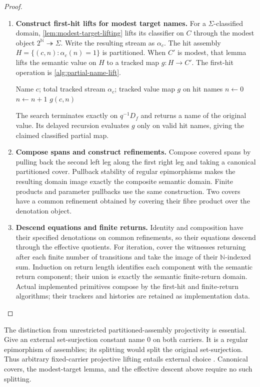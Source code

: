 \documentclass[11pt,a4paper]{article}
\numberwithin{algorithm}{section}
\numberwithin{equation}{section}
\theoremstyle{definition}
\theoremstyle{remark}
\theoremstyle{plain}
\newcommand{\N}{\mathbb N}
\newcommand{\onto}{\twoheadrightarrow}
\theoremstyle{definition}
\theoremstyle{plain}
\begin{document}
\begin{proof}
\begin{enumerate}[leftmargin=*,align=left]
\item \textbf{Construct first-hit lifts for modest target names.}
For a $\Sigma$-classified domain, \cref{lem:modest-target-lifting}
lifts its classifier on $C$ through the modest object
$2^\N\onto\Sigma$. Write the resulting stream as $\alpha_c$.
The hit assembly $H=\{(c,n):\alpha_c(n)=1\}$ is partitioned.
When $C'$ is modest, that lemma lifts the semantic value on $H$
to a tracked map $g:H\to C'$. The first-hit operation is
\cref{alg:partial-name-lift}.
\begin{algorithm}[H]
\caption{Tracked partial evaluation on a name}\label{alg:partial-name-lift}
\small
\begin{algorithmic}[1]
\Require Name $c$; total tracked stream $\alpha_c$; tracked value map $g$ on hit names
\State $n\gets0$
  \State $n\gets n+1$
\EndWhile
\State \Return $g(c,n)$
\end{algorithmic}
\end{algorithm}
The search terminates exactly on $q^{-1}D_f$ and returns a name
of the original value. Its delayed recursion evaluates $g$ only
on valid hit names, giving the claimed classified partial map.

\item \textbf{Compose spans and construct refinements.}
Compose covered spans by pulling back the second left leg along
the first right leg and taking a canonical partitioned cover.
Pullback stability of regular epimorphisms makes the resulting
domain image exactly the composite semantic domain. Finite
products and parameter pullbacks use the same construction.
Two covers have a common refinement obtained by covering their
fibre product over the denotation object.

\item \textbf{Descend equations and finite returns.}
Identity and composition have their specified denotations on
common refinements, so their equations descend through the
effective quotients. For iteration, cover the witnesses returning
after each finite number of transitions and take the image of
their $\N$-indexed sum. Induction on return length identifies
each component with the semantic return component; their union
is exactly the semantic finite-return domain. Actual implemented
primitives compose by the first-hit and finite-return algorithms;
their trackers and histories are retained as implementation data.
\end{enumerate}
\end{proof}

The distinction from unrestricted partitioned-assembly projectivity
is essential. Give an external set-surjection constant name $0$ on
both carriers. It is a regular epimorphism of assemblies; its
splitting would split the original set-surjection. Thus arbitrary
fixed-carrier projective lifting entails external choice
\citep[Section 2.4]{Hofstra2003Completions}. Canonical covers, the
modest-target lemma, and the effective descent above require no
such splitting.
\end{document}
